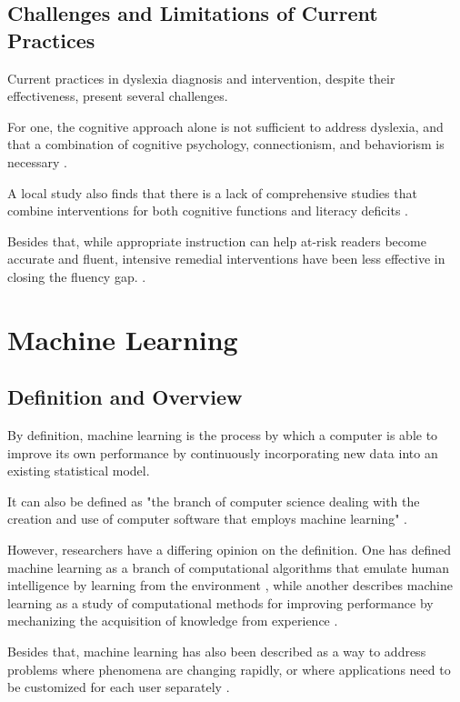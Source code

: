 \newpage
\subsection{Challenges and Limitations of Current Practices}
Current practices in dyslexia diagnosis and intervention, despite their effectiveness, present several challenges. 

For one, the cognitive approach alone is not sufficient to address dyslexia, and that a combination of cognitive psychology, connectionism, and behaviorism is necessary \parencite{Tnnessen1999}.

A local study also finds that there is a lack of comprehensive studies that combine interventions for both cognitive functions and literacy deficits \parencite{Anis2018}. 

Besides that, while appropriate instruction can help at-risk readers become accurate and fluent, intensive remedial interventions have been less effective in closing the fluency gap. \parencite{Alexander2004}.


\newpage
\section{Machine Learning}
\subsection{Definition and Overview}
By definition, machine learning is the process by which a computer is able to improve its own performance by continuously incorporating new data into an existing statistical model. 

It can also be defined as "the branch of computer science dealing with the creation and use of computer software that employs machine learning" \parencite{mw:machine-learning}.

However, researchers have a differing opinion on the definition. One has defined machine learning as a branch of computational algorithms that emulate human intelligence by learning from the environment \parencite{ElNaqa2015}, while another describes machine learning as a study of computational methods for improving performance by mechanizing the acquisition of knowledge from experience \parencite{Langley1995}. 

Besides that, machine learning has also been described as a way to address problems where phenomena are changing rapidly, or where applications need to be customized for each user separately \parencite{Dietterich1996}.

